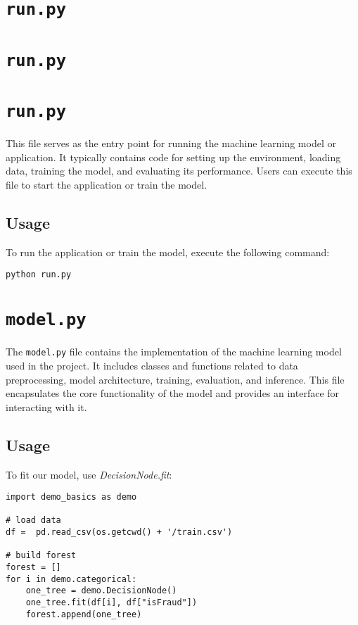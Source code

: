 \documentclass{article}
\begin{document}
\section*{\texttt{run.py}}



\section*{\texttt{run.py}}






\section*{\texttt{run.py}}

This file serves as the entry point for running the machine learning model or application. It typically contains code for setting up the environment, loading data, training the model, and evaluating its performance. Users can execute this file to start the application or train the model.

\subsection*{Usage}

To run the application or train the model, execute the following command:

\begin{verbatim}
python run.py
\end{verbatim}

\section*{\texttt{model.py}}

The \texttt{model.py} file contains the implementation of the machine learning model used in the project. It includes classes and functions related to data preprocessing, model architecture, training, evaluation, and inference. This file encapsulates the core functionality of the model and provides an interface for interacting with it.

\subsection*{Usage}

To fit our model, use \textit{DecisionNode.fit}:

\begin{verbatim}
import demo_basics as demo

# load data
df =  pd.read_csv(os.getcwd() + '/train.csv')

# build forest
forest = []
for i in demo.categorical:
    one_tree = demo.DecisionNode()
    one_tree.fit(df[i], df["isFraud"])
    forest.append(one_tree)

\end{verbatim}
\end{document}
